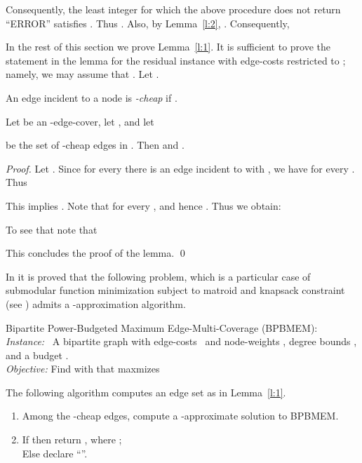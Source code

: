\documentclass{llncs}
\begin{document}
Consequently, the least integer  for which the above procedure does not return ``ERROR''
satisfies . Thus
.
Also, by Lemma~\ref{l:2}, . 
Consequently, 


In the rest of this section we prove Lemma~\ref{l:1}. 
It is sufficient to prove the statement in the lemma for the residual 
instance  with edge-costs restricted to ; 
namely, we may assume that .
Let .

\begin{definition}
An edge  incident to a node  is {\em -cheap} if 
.
\end{definition}

\begin{lemma} \label{l:cheap}
Let  be an -edge-cover, let , and let 
 
be the set of -cheap edges in .
Then  and .
\end{lemma}
\begin{proof}
Let . 
Since for every  there is an edge  incident to
 with ,
we have  for every .
Thus

This implies . 
Note that for every ,
 and hence .
Thus we obtain:
 

To see that  note that

This concludes the proof of the lemma.
\qed
\end{proof}

In \cite{KMNT} it is proved that the following problem,
which is a particular case of submodular function  minimization subject to 
matroid and knapsack constraint (see \cite{LNMN}) admits a 
-approximation algorithm.

\vspace{0.2cm}

\noindent
{\sf Bipartite Power-Budgeted Maximum Edge-Multi-Coverage} ({\sf BPBMEM}): \\
{\em Instance:} \ A bipartite graph  with edge-costs ~and
\hphantom{\em Instance: } node-weights ,  
degree bounds , and a \hphantom{\em Instance: } budget .\\
{\em Objective:} Find  with  that maxmizes


\vspace{0.2cm}

The following algorithm computes an edge set as in Lemma~\ref{l:1}. 
\begin{enumerate}
\item
Among the -cheap edges, compute a -approximate
solution  to {\sf BPBMEM}.
\item
If  then return , where 
; \\
Else declare ``''.
\end{enumerate}
\end{document}
